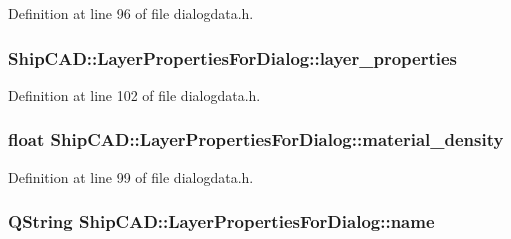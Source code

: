 Definition at line 96 of file dialogdata.\+h.

\subsubsection[{\texorpdfstring{layer\+\_\+properties}{layer_properties}}]{ Ship\+C\+A\+D\+::\+Layer\+Properties\+For\+Dialog\+::layer\+\_\+properties}\hypertarget{structShipCAD_1_1LayerPropertiesForDialog_a3175b253fd29d654cafe5b359f34a2b4}{}\label{structShipCAD_1_1LayerPropertiesForDialog_a3175b253fd29d654cafe5b359f34a2b4}


Definition at line 102 of file dialogdata.\+h.

\subsubsection[{\texorpdfstring{material\+\_\+density}{material_density}}]{\setlength{\rightskip}{0pt plus 5cm}float Ship\+C\+A\+D\+::\+Layer\+Properties\+For\+Dialog\+::material\+\_\+density}\hypertarget{structShipCAD_1_1LayerPropertiesForDialog_a1d0c75ad5128b805bf99aab57212127f}{}\label{structShipCAD_1_1LayerPropertiesForDialog_a1d0c75ad5128b805bf99aab57212127f}


Definition at line 99 of file dialogdata.\+h.

\subsubsection[{\texorpdfstring{name}{name}}]{\setlength{\rightskip}{0pt plus 5cm}Q\+String Ship\+C\+A\+D\+::\+Layer\+Properties\+For\+Dialog\+::name}\hypertarget{structShipCAD_1_1LayerPropertiesForDialog_a09578942af620f75d1599887672ec8da}{}\label{structShipCAD_1_1LayerPropertiesForDialog_a09578942af620f75d1599887672ec8da}


